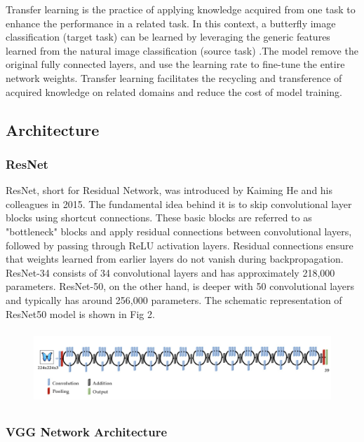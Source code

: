 \documentclass[10pt,twocolumn,letterpaper]{article}
\begin{document}
Transfer learning is the practice of applying knowledge acquired from one task to enhance the performance in a related task\cite{chang2017fine}. In this context, a butterfly image classification (target task) can be learned by leveraging the generic features learned from the natural image classification (source task) .The model remove the original fully connected layers, and use the learning rate to fine-tune the entire network weights. Transfer learning facilitates the recycling and transference of acquired knowledge on related domains and reduce the cost of model training.

\subsection{ Architecture }
\subsubsection{ResNet} 
ResNet, short for Residual Network, was introduced by Kaiming He and his colleagues in 2015\cite{he2016deep}. The fundamental idea behind it is to skip convolutional layer blocks using shortcut connections. These basic blocks are referred to as "bottleneck" blocks and apply residual connections between convolutional layers, followed by passing through ReLU activation layers. Residual connections ensure that weights learned from earlier layers do not vanish during backpropagation. ResNet-34 consists of 34 convolutional layers and has approximately 218,000 parameters. ResNet-50, on the other hand, is deeper with 50 convolutional layers and typically has around 256,000 parameters.
The schematic representation of ResNet50 model is shown in Fig 2.
\begin{figure}[h]
    \centering
    \includegraphics[width=\columnwidth, height=1.1in]{res50} %
    \caption{}
    \label{fig:svm-lr}
\end{figure}



\subsubsection{ VGG Network Architecture}
\end{document}
